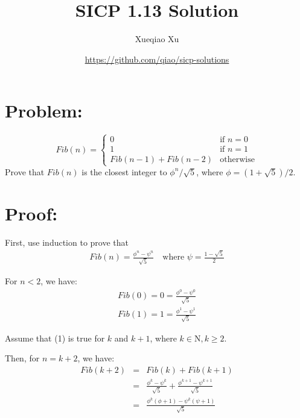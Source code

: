 \documentclass{article}
\begin{document}
\title{SICP 1.13 Solution}
\author{Xueqiao Xu}
\date{\url{https://github.com/qiao/sicp-solutions}}
\maketitle

\section*{Problem:}

    \[
        Fib(n) = \left\{ 
                 \begin {array}{ll}
                 0 & \textrm{if $n = 0$} \\
                 1 & \textrm{if $n = 1$} \\
                 Fib(n - 1) + Fib(n - 2) & \textrm{otherwise}
                 \end{array}
                 \right.
    \]
    Prove that $Fib(n)$ is the closest integer to $\phi^{n} / \sqrt{5}$, where 
    $\phi = (1 + \sqrt{5}) / 2$.

\section*{Proof:}


    First, use induction to prove that 
    \begin{eqnarray}
        Fib(n) = \frac{\phi^{n} - \psi^{n}}{\sqrt{5}} \quad
        \textrm{where $\psi = \frac{1 - \sqrt{5}}{2}$}
    \end{eqnarray}


    \noindent
    For $n < 2$, we have:
    \begin{eqnarray}
        Fib(0) = 0 = \frac{\phi^{0} - \psi^{0}}{\sqrt{5}}\\
        Fib(1) = 1 = \frac{\phi^{1} - \psi^{1}}{\sqrt{5}}
    \end{eqnarray}


    \noindent
    Assume that (1) is true for $k$ and $k + 1$, where $k \in \mathrm{N}, k \geq 2$. 


    \noindent
    Then, for $n = k + 2$, we have:
    \begin{eqnarray}
        Fib(k + 2) &=& Fib(k) + Fib(k + 1) \nonumber \\
                   &=& \frac{\phi^{k} - \psi^{k}}{\sqrt{5}} + 
                       \frac{\phi^{k + 1} - \psi^{k + 1}}{\sqrt{5}} \nonumber \\
                   &=& \frac{\phi^{k}(\phi + 1) - \psi^{k}(\psi + 1)}{\sqrt{5}}
    \end{eqnarray}
\end{document}
